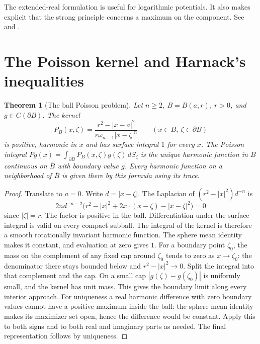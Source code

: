\documentclass[11pt,oneside,openany]{book}
\theoremstyle{plain}
\newtheorem{theorem}{Theorem}[chapter]
\theoremstyle{definition}
\theoremstyle{remark}
\begin{document}
The extended-real formulation is useful for logarithmic
potentials. It also makes explicit that the strong principle
concerns a maximum on the component. See
\cite[Chapter 3]{AG} and \cite[Section 2.8]{GT}.

\section{The Poisson kernel and Harnack's inequalities}
\label{pde:L05}

\begin{theorem}[The ball Poisson problem]
\label{thm:pde-ball-poisson}
Let \(n\ge2\), \(B=B(a,r)\), \(r>0\), and \(g\in C(\partial B)\).
The kernel
\[
 P_B(x,\zeta)=\frac{r^2-|x-a|^2}
                  {r\omega_{n-1}|x-\zeta|^n}
 \qquad (x\in B,\ \zeta\in\partial B)
\]
is positive, harmonic in \(x\) and has surface integral \(1\)
for every \(x\). The Poisson integral
\(Pg(x)=\int_{\partial B}P_B(x,\zeta)g(\zeta)\,dS_\zeta\)
is the unique harmonic function in \(B\) continuous on
\(\overline B\) with boundary value \(g\).
Every harmonic function on a neighborhood of \(\overline B\)
is given there by this formula using its trace.
\end{theorem}
\begin{proof}
Translate to \(a=0\). Write \(d=|x-\zeta|\).
The Laplacian of \((r^2-|x|^2)d^{-n}\) is
\[
 2n d^{-n-2}
 \bigl(r^2-|x|^2+2x\cdot(x-\zeta)-|x-\zeta|^2\bigr)=0
\]
since \(|\zeta|=r\). The factor is positive in the ball.
Differentiation under the surface integral is valid on every
compact subball. The integral of the kernel is therefore
a smooth rotationally invariant harmonic function. The
sphere mean identity makes it constant, and evaluation at
zero gives \(1\). For a boundary point \(\zeta_0\), the
mass on the complement of any fixed cap around \(\zeta_0\)
tends to zero as \(x\to\zeta_0\): the denominator there
stays bounded below and \(r^2-|x|^2\to0\). Split the integral
into that complement and the cap. On a small cap
\(|g(\zeta)-g(\zeta_0)|\) is uniformly small, and the
kernel has unit mass. This gives the boundary limit along
every interior approach. For uniqueness a real harmonic
difference with zero boundary values cannot have a positive
maximum inside the ball: the sphere mean identity makes its
maximizer set open, hence the difference would be constant.
Apply this to both signs and to both real and imaginary parts
as needed. The final representation follows by uniqueness.
\end{proof}
\end{document}
